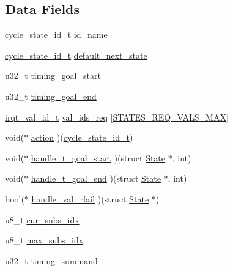 \subsection*{Data Fields}
\begin{DoxyCompactItemize}
\item 
\hyperlink{states_8h_a9e0ef0bc98a491d55216d9485e562252}{cycle\+\_\+state\+\_\+id\+\_\+t} \hyperlink{struct_state_abb59b67712b25f52806b3a75d5ced8e1}{id\+\_\+name}
\item 
\hyperlink{states_8h_a9e0ef0bc98a491d55216d9485e562252}{cycle\+\_\+state\+\_\+id\+\_\+t} \hyperlink{struct_state_af9d8ee1d5b2527603692e4e16a510dfc}{default\+\_\+next\+\_\+state}
\item 
u32\+\_\+t \hyperlink{struct_state_a460c2961861ad0bfe6b175e2d310fa5a}{timing\+\_\+goal\+\_\+start}
\item 
u32\+\_\+t \hyperlink{struct_state_af1c6f6dee4c21d85ddf7da3864d1cbee}{timing\+\_\+goal\+\_\+end}
\item 
\hyperlink{irqtestperipheral_8h_a3485d29696b63704b7a6454519c3d0c5}{irqt\+\_\+val\+\_\+id\+\_\+t} \hyperlink{struct_state_ab6d93aa56200181dd2b06e3eda4bc090}{val\+\_\+ids\+\_\+req} \mbox{[}\hyperlink{states_8h_ac7f2a6758dc88e00b49c5d4152ef468e}{S\+T\+A\+T\+E\+S\+\_\+\+R\+E\+Q\+\_\+\+V\+A\+L\+S\+\_\+\+M\+AX}\mbox{]}
\item 
void($\ast$ \hyperlink{struct_state_a55d5000db1bebc1ee6f6d6d5b3bb6673}{action} )(\hyperlink{states_8h_a9e0ef0bc98a491d55216d9485e562252}{cycle\+\_\+state\+\_\+id\+\_\+t})
\item 
void($\ast$ \hyperlink{struct_state_a85025dd68c4035546894c6b14542e528}{handle\+\_\+t\+\_\+goal\+\_\+start} )(struct \hyperlink{struct_state}{State} $\ast$, int)
\item 
void($\ast$ \hyperlink{struct_state_ab347ebabf77bbde522554a8d663ec4a5}{handle\+\_\+t\+\_\+goal\+\_\+end} )(struct \hyperlink{struct_state}{State} $\ast$, int)
\item 
bool($\ast$ \hyperlink{struct_state_a840b9de3ab0a84eed21af071a716348b}{handle\+\_\+val\+\_\+rfail} )(struct \hyperlink{struct_state}{State} $\ast$)
\item 
u8\+\_\+t \hyperlink{struct_state_a06b41367cc51f722ce294c92dc341e93}{cur\+\_\+subs\+\_\+idx}
\item 
u8\+\_\+t \hyperlink{struct_state_a73f7b81a54eb23206152bb815a0de136}{max\+\_\+subs\+\_\+idx}
\item 
u32\+\_\+t \hyperlink{struct_state_ad775f6c08e398dddae5d7fbcd8487b6d}{timing\+\_\+summand}
\end{DoxyCompactItemize}


